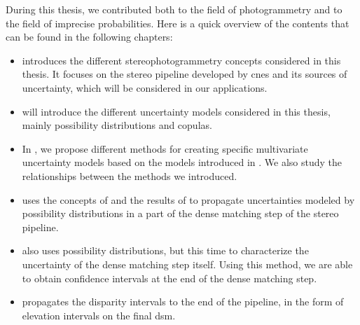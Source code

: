 During this thesis, we contributed both to the field of photogrammetry and to the field of imprecise probabilities. Here is a quick overview of the contents that can be found in the following chapters:
\begin{itemize}
    \item {} introduces the different stereophotogrammetry concepts considered in this thesis. It focuses on the stereo pipeline developed by \acrshort{cnes} and its sources of uncertainty, which will be considered in our applications.
    \item {} will introduce the different uncertainty models considered in this thesis, mainly possibility distributions and copulas.
    \item In , we propose different methods for creating specific multivariate uncertainty models based on the models introduced in . We also study the relationships between the methods we introduced.
    \item {} uses the concepts of  and the results of  to propagate uncertainties modeled by possibility distributions in a part of the dense matching step of the stereo pipeline.
    \item {} also uses possibility distributions, but this time to characterize the uncertainty of the dense matching step itself. Using this method, we are able to obtain confidence intervals at the end of the dense matching step. 
    \item {} propagates the disparity intervals to the end of the pipeline, in the form of elevation intervals on the final \acrshort{dsm}. 
\end{itemize}

